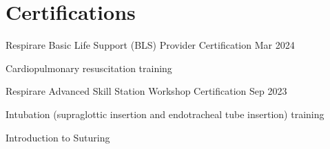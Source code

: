\vspace{-3mm}
\section{Certifications}
\resumeSubHeadingListStart

\resumeProject
{Respirare Basic Life Support (BLS) Provider Certification}
{}
{Mar 2024}

\resumeItemListStart
\item[$\bullet$] Cardiopulmonary resuscitation training
\resumeItemListEnd

\resumeProject
{Respirare Advanced Skill Station Workshop Certification}
{}
{Sep 2023}

\resumeItemListStart
		\item[$\bullet$] Intubation (supraglottic insertion and endotracheal tube insertion) training
        \item[$\bullet$] Introduction to Suturing
\resumeItemListEnd

\resumeSubHeadingListEnd
\vspace{-5.5mm}